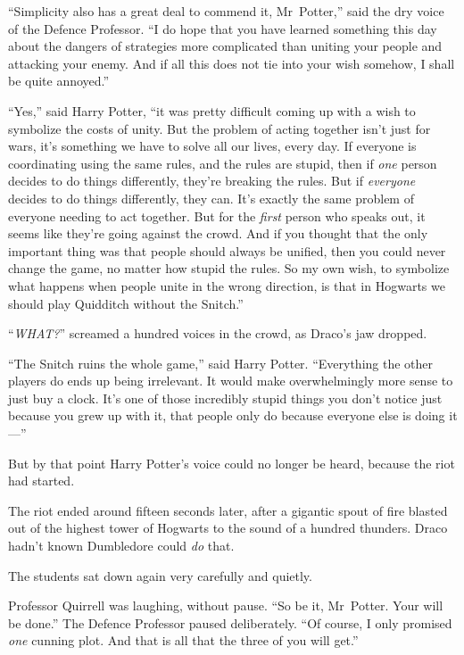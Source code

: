 “Simplicity also has a great deal to commend it, Mr~Potter,” said the dry
voice of the Defence Professor. “I do hope that you have learned something this
day about the dangers of strategies more complicated than uniting your people
and attacking your enemy. And if all this does not tie into your wish somehow,
I shall be quite annoyed.”

“Yes,” said Harry Potter, “it was pretty difficult coming up with a wish to
symbolize the costs of unity. But the problem of acting together isn’t just for
wars, it’s something we have to solve all our lives, every day. If everyone is
coordinating using the same rules, and the rules are stupid, then if \emph{one}
person decides to do things differently, they’re breaking the rules. But if
\emph{everyone} decides to do things differently, they can. It’s exactly the
same problem of everyone needing to act together. But for the \emph{first}
person who speaks out, it seems like they’re going against the crowd. And if
you thought that the only important thing was that people should always be
unified, then you could never change the game, no matter how stupid the rules.
So my own wish, to symbolize what happens when people unite in the wrong
direction, is that in Hogwarts we should play Quidditch without the Snitch.”

“\emph{WHAT?}” screamed a hundred voices in the crowd, as Draco’s jaw dropped.

“The Snitch ruins the whole game,” said Harry Potter. “Everything the other
players do ends up being irrelevant. It would make overwhelmingly more sense to
just buy a clock. It’s one of those incredibly stupid things you don’t notice
just because you grew up with it, that people only do because everyone else is
doing it—”

But by that point Harry Potter’s voice could no longer be heard, because the
riot had started.

\later

The riot ended around fifteen seconds later, after a gigantic spout of fire
blasted out of the highest tower of Hogwarts to the sound of a hundred
thunders. Draco hadn’t known Dumbledore could \emph{do} that.

The students sat down again very carefully and quietly.

Professor Quirrell was laughing, without pause. “So be it, Mr~Potter. Your
will be done.” The Defence Professor paused deliberately. “Of course, I only
promised \emph{one} cunning plot. And that is all that the three of you will
get.”

